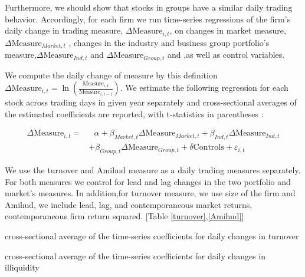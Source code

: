 \documentclass[12pt, a4paper]{article}
\begin{document}
Furthermore, we should show that stocks in groups have a similar daily trading behavior. Accordingly, for each firm we run time-series regressions of the firm's daily change in trading measure, $ \Delta \text{Measure}_{i,t} $, on changes in market measure,$ \Delta\text{Measure}_{Market,t}   $ , changes in the industry and business group portfolio's measure,$ \Delta\text{Measure}_{Ind,t} $ and  $\Delta \text{Measure}_{Group,t} $ and  ,as well as control variables.

 We compute the daily change of measure by this definition $ \Delta \text{Measure}_{i,t} = \ln(\frac{\text{Measure}_{i,t}}{\text{Measure}_{i,t-1}}) $. 
We estimate the following regression for each stock across trading days in given year separately and cross-sectional averages of the estimated coefficients are reported, with t-statistics in parentheses :

\begin{equation*}
	\begin{split}
			\Delta \text{Measure}_{i,t} =  & \text{	}\alpha + \beta_{Market,t} \Delta \text{Measure}_{Market,t}  
		+ \beta_{Ind,t} \Delta \text{Measure}_{Ind,t} \\ & + \beta_{Group,t} \Delta \text{Measure}_{Group,t} + \delta\text{Controls} + \varepsilon_{i,t}
	\end{split}
\end{equation*}

We use the turnover and Amihud measure as a daily trading measures separately. For both measures we control for lead and lag changes in the two portfolio  and market's measures. In addition,for turnover measure, we use size of the firm and  Amihud, we include lead, lag, and contemporaneous market returns, contemporaneous firm return squared. [Table \ref{turnover},\ref{Amihud}]

	\begin{table}[htbp]
	\centering
	\caption{cross-sectional average of the time-series coefficients for daily changes in turnover }
	\resizebox{0.7\textheight}{!}{
		
	} \label{turnover}
\end{table}


	\begin{table}[htbp]
	\centering
	\caption{cross-sectional average of the time-series coefficients for daily changes in illiquidity  }
	\resizebox{0.7\textheight}{!}{
		\centering
		
	}
\label{Amihud}
\end{table}
\end{document}
